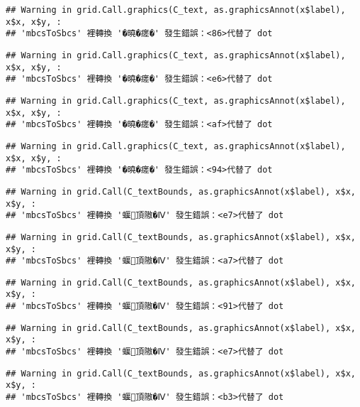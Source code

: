 \documentclass[
]{article}
\begin{document}
\begin{verbatim}
## Warning in grid.Call.graphics(C_text, as.graphicsAnnot(x$label), x$x, x$y, :
## 'mbcsToSbcs' 裡轉換 '�曉�瘥�' 發生錯誤：<86>代替了 dot
\end{verbatim}

\begin{verbatim}
## Warning in grid.Call.graphics(C_text, as.graphicsAnnot(x$label), x$x, x$y, :
## 'mbcsToSbcs' 裡轉換 '�曉�瘥�' 發生錯誤：<e6>代替了 dot
\end{verbatim}

\begin{verbatim}
## Warning in grid.Call.graphics(C_text, as.graphicsAnnot(x$label), x$x, x$y, :
## 'mbcsToSbcs' 裡轉換 '�曉�瘥�' 發生錯誤：<af>代替了 dot
\end{verbatim}

\begin{verbatim}
## Warning in grid.Call.graphics(C_text, as.graphicsAnnot(x$label), x$x, x$y, :
## 'mbcsToSbcs' 裡轉換 '�曉�瘥�' 發生錯誤：<94>代替了 dot
\end{verbatim}

\begin{verbatim}
## Warning in grid.Call(C_textBounds, as.graphicsAnnot(x$label), x$x, x$y, :
## 'mbcsToSbcs' 裡轉換 '蝘頂隞�Ⅳ' 發生錯誤：<e7>代替了 dot
\end{verbatim}

\begin{verbatim}
## Warning in grid.Call(C_textBounds, as.graphicsAnnot(x$label), x$x, x$y, :
## 'mbcsToSbcs' 裡轉換 '蝘頂隞�Ⅳ' 發生錯誤：<a7>代替了 dot
\end{verbatim}

\begin{verbatim}
## Warning in grid.Call(C_textBounds, as.graphicsAnnot(x$label), x$x, x$y, :
## 'mbcsToSbcs' 裡轉換 '蝘頂隞�Ⅳ' 發生錯誤：<91>代替了 dot
\end{verbatim}

\begin{verbatim}
## Warning in grid.Call(C_textBounds, as.graphicsAnnot(x$label), x$x, x$y, :
## 'mbcsToSbcs' 裡轉換 '蝘頂隞�Ⅳ' 發生錯誤：<e7>代替了 dot
\end{verbatim}

\begin{verbatim}
## Warning in grid.Call(C_textBounds, as.graphicsAnnot(x$label), x$x, x$y, :
## 'mbcsToSbcs' 裡轉換 '蝘頂隞�Ⅳ' 發生錯誤：<b3>代替了 dot
\end{verbatim}
\end{document}
